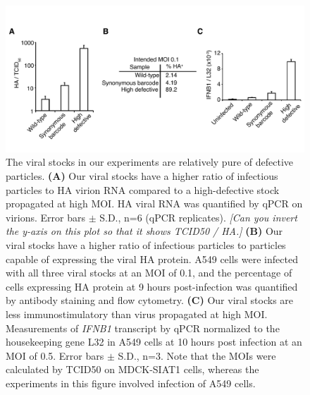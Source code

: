 \documentclass[9pt,lineno]{elife}
\newcommand{\jdbcomment}[1]{\emph{\color{red} [#1]}}
\begin{document}
\begin{figure}
\centerline{\includegraphics[width=0.7\linewidth]{figures/Validating_barcode_virus/validating_populations_D02.pdf}}
\caption{\label{fig:viruspopulations} The viral stocks in our experiments are relatively pure of defective particles. 
{\bf (A)}
Our viral stocks have a higher ratio of infectious particles to HA virion RNA compared to a high-defective stock propagated at high MOI.
HA viral RNA was quantified by qPCR on virions. 
Error bars $\pm$ S.D., n=6 (qPCR replicates). 
\jdbcomment{Can you invert the y-axis on this plot so that it shows TCID50 / HA.}
{\bf (B)} 
Our viral stocks have a higher ratio of infectious particles to particles capable of expressing the viral HA protein.
A549 cells were infected with all three viral stocks at an MOI of 0.1, and the percentage of cells expressing HA protein at 9 hours post-infection was quantified by antibody staining and flow cytometry.
{\bf (C)} 
Our viral stocks are less immunostimulatory than virus propagated at high MOI. 
Measurements of \textit{IFNB1} transcript by qPCR normalized to the housekeeping gene L32 in A549 cells at 10 hours post infection at an MOI of 0.5.
Error bars $\pm$ S.D., n=3.
Note that the MOIs were calculated by TCID50 on MDCK-SIAT1 cells, whereas the experiments in this figure involved infection of A549 cells.
}
\end{figure}
\end{document}

